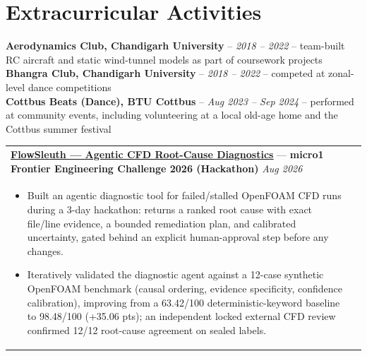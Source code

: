 \documentclass[a4paper,8pt]{article}
\newcommand{\ulhref}[2]{%
  {\hypersetup{urlcolor=.}\textcolor{.}{\href{#1}{\uline{#2}}}}%
}
\begin{document}
\section{Extracurricular Activities}
\color[HTML]{371e77}\textbf{Aerodynamics Club, Chandigarh University} \color[HTML]{000000}-- \textit{2018 -- 2022} -- team-built RC aircraft and static wind-tunnel models as part of coursework projects
\normalcolor\\
\color[HTML]{371e77}\textbf{Bhangra Club, Chandigarh University} \color[HTML]{000000}-- \textit{2018 -- 2022} -- competed at zonal-level dance competitions
\normalcolor\\
\color[HTML]{371e77}\textbf{Cottbus Beats (Dance), BTU Cottbus} \color[HTML]{000000}-- \textit{Aug 2023 -- Sep 2024} -- performed at community events, including volunteering at a local old-age home and the Cottbus summer festival
\normalcolor\\[6pt]
\begin{tabularx}{\linewidth}{ @{}l r@{} }
\textbf{\ulhref{https://github.com/Sanjanakamboj/flowsleuth}{FlowSleuth — Agentic CFD Root-Cause Diagnostics}} — \color[HTML]{371e77}\textbf{micro1 Frontier Engineering Challenge 2026 (Hackathon)} \hfill \textit{Aug 2026}\\[1pt]
\begin{minipage}[t]{\linewidth}
    \begin{itemize}[nosep,after=\strut, leftmargin=*, itemsep=1pt]
        \item Built an agentic diagnostic tool for failed/stalled OpenFOAM CFD runs during a 3-day hackathon: returns a ranked root cause with exact file/line evidence, a bounded remediation plan, and calibrated uncertainty, gated behind an explicit human-approval step before any changes.
        \item Iteratively validated the diagnostic agent against a 12-case synthetic OpenFOAM benchmark (causal ordering, evidence specificity, confidence calibration), improving from a 63.42/100 deterministic-keyword baseline to 98.48/100 (+35.06 pts); an independent locked external CFD review confirmed 12/12 root-cause agreement on sealed labels.
    \end{itemize}
\end{minipage}
\end{tabularx}
\end{document}
